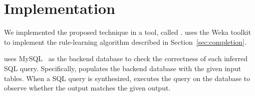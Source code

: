 
\section{Implementation}
\label{sec:implementation}

We implemented the proposed technique in a tool, called \ourtool. 
\ourtool uses the Weka toolkit~\cite{Hall:2009}
to implement the rule-learning algorithm described in
Section~\ref{sec:completion}. 

\ourtool uses MySQL~\cite{mysql} as the backend
database to check the correctness of each inferred
SQL query. Specifically, \ourtool populates the backend database
with the given input tables. When a SQL query is
synthesized, \ourtool executes the query on the database
to observe whether the output matches the given output.

